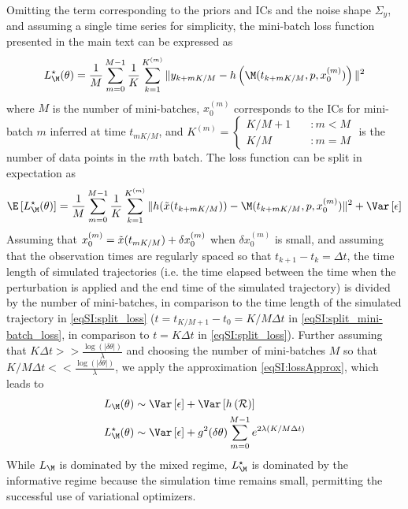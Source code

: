 Omitting the term corresponding to the priors and ICs and the noise shape $\Sigma_y$, and assuming a single time series for simplicity, 
the mini-batch loss function presented in the main text can be expressed as
\begin{equation}\label{eqSI:mini-batch_loss_fn}
        L_\M^\star(\theta) = \frac{1}{M} \sum_{m=0}^{M-1} \frac{1}{K} \sum_{k=1}^{K^{(m)}} \|y_{k + m K/M } - h\left(\M(t_{k + m K/M}, p, x_{0}^{(m)})\right)\|^2
\end{equation}
%
where $M$ is the number of mini-batches, $x_0^{(m)}$ corresponds to the ICs for mini-batch $m$ inferred at time $t_{m K/M}$, and
$K^{(m)} = \begin{cases} K / M + 1 &\quad \colon m < M \\ 
                    K / M &\quad \colon m = M
        \end{cases}$ is the number of data points in the $m$th batch.
%
The loss function can be split in expectation as
\begin{equation}\label{eqSI:split_mini-batch_loss}
		\E \left[L_{\M}^{\star}(\theta) \right] = \frac{1}{M} \sum_{m=0}^{M-1} \frac{1}{K} \sum_{k=1}^{K^{(m)}} \| h(\Tilde x(t_{k + m K/M})) - \M(t_{k + m K/M},p, x_0^{(m)})\|^2 + \Var\left[\epsilon\right]
\end{equation}
% 
Assuming that $x_0^{(m)} = \Tilde x (t_{m K/M}) + \delta x_0^{(m)} $ when $\delta x_0^{(m)}$ is small, and assuming that the observation times are regularly spaced so that $t_{k+1} - t_{k} = \Delta t$, the time length of simulated trajectories (i.e. the time elapsed between the time when the perturbation is applied and the end time of the simulated trajectory) is divided by the number of mini-batches, in comparison to the time length of the simulated trajectory in \cref{eqSI:split_loss}  ($t = t_{K/M + 1} - t_{0} = K/M \Delta t$ in \cref{eqSI:split_mini-batch_loss}, in comparison to $t = K \Delta t$ in \cref{eqSI:split_loss}).
% 
Further assuming that $K \Delta t >> \frac{\log(|\delta \theta|)}{\lambda}$ and choosing the number of mini-batches $M$ so that $K / M \Delta t << \frac{\log(|\delta \theta|)}{\lambda}$, we apply the approximation \cref{eqSI:lossApprox}, which leads to
\begin{equation}\label{eqSI:comparision_losses}
	\begin{aligned}
		&L_{\M}(\theta) \sim \Var\left[\epsilon\right] + 
		\Var\left[ h\left(\mathcal{R}\right) \right]\\
		&L_{\M}^{\star}(\theta) \sim \Var\left[\epsilon\right] + 
		g^2(\delta \theta) \sum_{m=0}^{M-1} e^{2\lambda (K / M \Delta t)}
	\end{aligned}
\end{equation}
While $L_{\M}$ is dominated by the mixed regime, $L_\M^\star$ is dominated by the informative regime because the simulation time remains small, permitting the successful use of variational optimizers.

